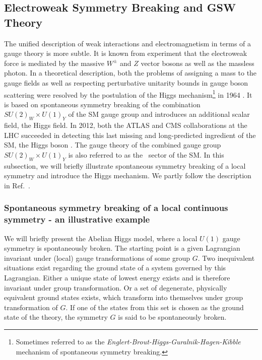 \subsection{Electroweak Symmetry Breaking and GSW Theory}
\label{sec:gws}
The unified description of weak interactions and electromagnetism in
terms of a gauge theory is more subtle. It is known from experiment that the electroweak force is
mediated by the massive $W^\pm$ and $Z$ vector bosons as well as the
massless photon. In a theoretical description, both the problems of assigning a mass to the gauge fields as well
as respecting perturbative
unitarity bounds in gauge boson scattering were resolved by the
postulation of the Higgs mechanism\footnote{Sometimes referred to as the \textit{Englert-Brout-Higgs-Guralnik-Hagen-Kibble}
  \cite{Guralnik1964,Kibble1967} mechanism of spontaneous symmetry breaking.} in 1964
\cite{Higgs1964b,Higgs1964,Englert1964,Higgs1966}. It is based on
spontaneous symmetry breaking of the combination $SU(2)_W\times U(1)_Y$ of the SM gauge group and introduces an additional scalar field, the
Higgs field. In 2012, both the ATLAS and CMS collaborations at the LHC
succeeded in detecting this last missing and long-predicted ingredient
of the SM, the Higgs boson \cite{hdiscatlas,hdisccms}. The gauge theory of the combined gauge group $SU(2)_W\times
U(1)_Y$ is also referred to as the \ew~sector of the SM. In this subsection, we will briefly illustrate spontaneous
symmetry breaking of a local symmetry and introduce the Higgs mechanism. We partly follow the description in Ref.~\cite{Dittmaier:2012nh}.

\subsubsection{Spontaneous symmetry breaking of a local continuous symmetry - an illustrative example}
\label{sec:spontbreak}
We will briefly present the Abelian Higgs model, where a local $U(1)$
gauge symmetry is spontaneously broken. The starting point is a given Lagrangian invariant under (local) gauge
transformations of some group $G$. Two inequivalent situations exist regarding the ground state
of a system governed by this Lagrangian. Either a unique state of
lowest energy exists and is therefore invariant under group
transformation. Or a set of degenerate, physically equivalent ground
states exists, which transform into themselves under group
transformation of $G$. If one of the states from this set is chosen
as the ground state of the theory,
the symmetry
$G$ is said to be spontaneously broken. 

